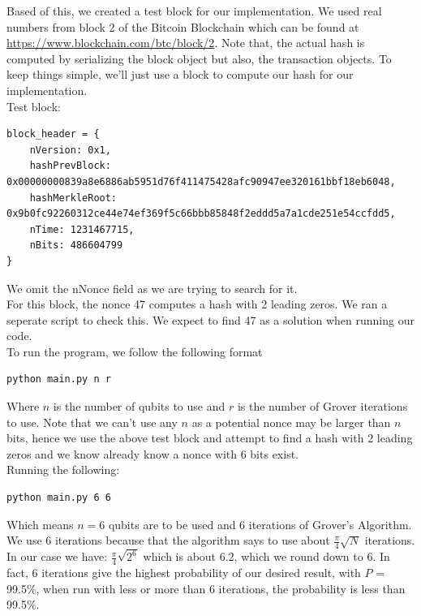 \documentclass[11pt]{article} %
\begin{document}
\noindent Based of this, we created a test block for our implementation. We used real numbers from block 2 of the Bitcoin Blockchain which can be found at \url{https://www.blockchain.com/btc/block/2}. Note that, the actual hash is computed by serializing the block object but also, the transaction objects. To keep things simple, we'll just use a block to compute our hash for our implementation.\\

\noindent Test block:
\begin{verbatim}
block_header = {
    nVersion: 0x1,
    hashPrevBlock: 0x00000000839a8e6886ab5951d76f411475428afc90947ee320161bbf18eb6048,
    hashMerkleRoot: 0x9b0fc92260312ce44e74ef369f5c66bbb85848f2eddd5a7a1cde251e54ccfdd5,
    nTime: 1231467715,
    nBits: 486604799
}
\end{verbatim}

\noindent We omit the nNonce field as we are trying to search for it.\\

\noindent For this block, the nonce 47 computes a hash with 2 leading zeros. We ran a seperate script to check this. We expect to find 47 as a solution when running our code.\\

\noindent To run the program, we follow the following format
\begin{verbatim}
python main.py n r
\end{verbatim}

\noindent Where $n$ is the number of qubits to use and $r$ is the number of Grover iterations to use. Note that we can't use any $n$ as a potential nonce may be larger than $n$ bits, hence we use the above test block and attempt to find a hash with 2 leading zeros and we know already know a nonce with 6 bits exist.\\

\noindent Running the following:


\begin{verbatim}
python main.py 6 6
\end{verbatim}

\noindent Which means $n = 6$ qubits are to be used and 6 iterations of Grover's Algorithm. We use 6 iterations because that the algorithm says to use about $\frac{\pi}{4} \sqrt{N}$ iterations. In our case we have: $\frac{\pi}{4} \sqrt{2^6}$ which is about 6.2, which we round down to 6. In fact, 6 iterations give the highest probability of our desired result, with $P$ = 99.5\%, when run with less or more than 6 iterations, the probability is less than 99.5\%. \\
\end{document}
